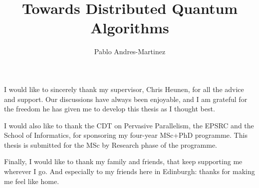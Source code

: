 \documentclass[mscres, lfcs, twoside, logo]{infthesis}
\title{Towards Distributed Quantum Algorithms}
\author{Pablo Andres-Martinez}
\begin{document}


\begin{preliminary}

\maketitle

\begin{laysummary}
  
\end{laysummary}

\begin{acknowledgements}
I would like to sincerely thank my supervisor, Chris Heunen, for all the advice and support. Our discussions have always been enjoyable, and I am grateful for the freedom he has given me to develop this thesis as I thought best.

I would also like to thank the CDT on Pervasive Parallelism, the EPSRC and the School of Informatics, for sponsoring my four-year MSc+PhD programme. This thesis is submitted for the MSc by Research phase of the programme.

Finally, I would like to thank my family and friends, that keep supporting me wherever I go. And especially to my friends here in Edinburgh: thanks for making me feel like home.
\end{acknowledgements}

\standarddeclaration


\tableofcontents


\end{preliminary}








\appendix







\end{document}
